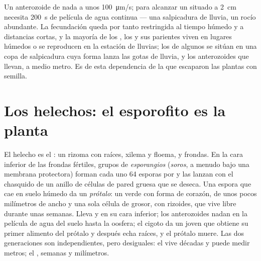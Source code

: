 \begin{example}\label{ex:b2:plant-life-cycles:sperm}
Un anterozoide de  nada a unos \qty{100}{\micro m/s}; para
alcanzar un  situado a \qty{2}{cm} necesita \qty{200}{s} de
película de agua continua --- una salpicadura de lluvia, un rocío
abundante. La fecundación queda por tanto restringida al tiempo húmedo y
a distancias cortas, y la mayoría de los , los  y sus
parientes viven en lugares húmedos o se reproducen en la estación de
lluvias; los  de algunos  se sitúan en una copa de
salpicadura cuya forma lanza las gotas de lluvia, y los anterozoides
que llevan, a medio metro. Es de esta dependencia de la que escaparon las
plantas con semilla.
\end{example}

\section{Los helechos: el esporofito es la planta}

\begin{definition}\label{def:b2:plant-life-cycles:fern}
El helecho es el \emph{}: un rizoma con raíces, xilema y floema,
y frondas. En la cara inferior de las frondas fértiles, grupos de
\emph{esporangios} (\emph{soros}, a menudo bajo una membrana protectora)
forman cada uno 64 esporas por  y las lanzan con el chasquido de un
anillo de células de pared gruesa que se deseca. Una espora que cae en
suelo húmedo da un \emph{prótalo}: un  verde con forma de
corazón, de unos pocos milímetros de ancho y una sola célula de grosor,
con rizoides, que vive libre durante unas semanas. Lleva  y
 en su cara inferior; los anterozoides nadan en la película
de agua del suelo hasta la oosfera; el cigoto da un  joven que
obtiene su primer alimento del prótalo y después echa raíces, y el
prótalo muere. Las dos generaciones son independientes, pero desiguales:
el  vive décadas y puede medir metros; el , semanas y
milímetros.
\end{definition}

